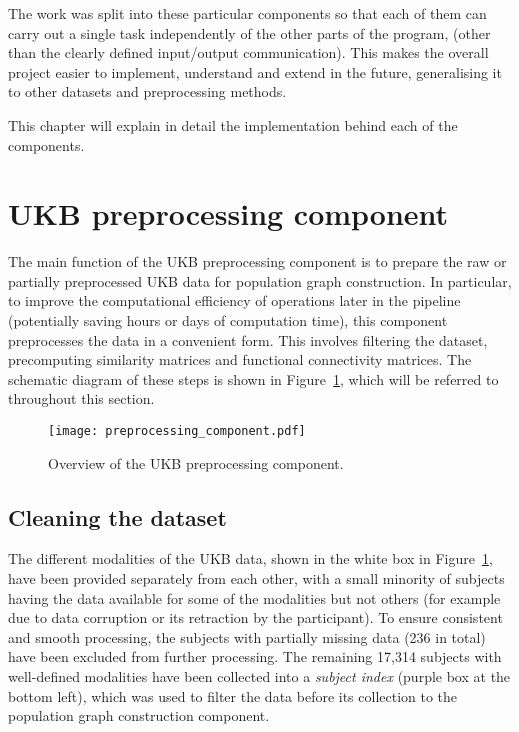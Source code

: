 The work was split into these particular components so that each of them can carry out a single task independently of the other parts of the program, (other than the clearly defined input/output communication). This makes the overall project easier to implement, understand and extend in the future, generalising it to other datasets and preprocessing methods. 

This chapter will explain in detail the implementation behind each of the components.

\section{UKB preprocessing component}

The main function of the UKB preprocessing component is to prepare the raw or partially preprocessed UKB data for population graph construction. In particular, to improve the computational efficiency of operations later in the pipeline (potentially saving hours or days of computation time), this component preprocesses the data in a convenient form. This involves filtering the dataset, precomputing similarity matrices and functional connectivity matrices. The schematic diagram of these steps is shown in Figure~\ref{preprocessing-component}, which will be referred to throughout this section.

\begin{figure}[h]
    \centering
    \texttt{[image: preprocessing\_component.pdf]}
    \caption{Overview of the UKB preprocessing component.}\label{preprocessing-component}
\end{figure}

\subsection{Cleaning the dataset}
The different modalities of the UKB data, shown in the white box in Figure~\ref{preprocessing-component}, have been provided separately from each other, with a small minority of subjects having the data available for some of the modalities but not others (for example due to data corruption or its retraction by the participant). To ensure consistent and smooth processing, the subjects with partially missing data (236 in total) have been excluded from further processing. The remaining 17,314 subjects with well-defined modalities have been collected into a \textit{subject index} (purple box at the bottom left), which was used to filter the data before its collection to the population graph construction component.


